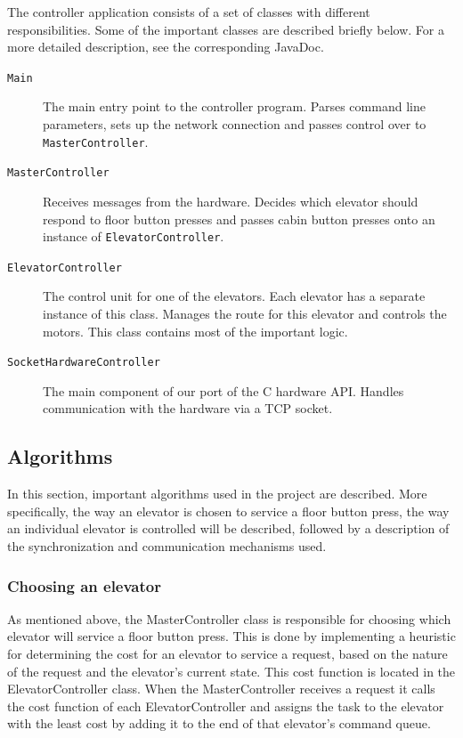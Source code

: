 \documentclass[a4paper]{article}
\begin{document}
The controller application consists of a set of classes with different
responsibilities. Some of the important classes are described briefly below. For
a more detailed description, see the corresponding JavaDoc.

\begin{description}

\item[\texttt{Main}] The main entry point to the controller program. Parses
    command line parameters, sets up the network connection and passes control
    over to \texttt{MasterController}.

\item[\texttt{MasterController}] Receives messages from the hardware. Decides
    which elevator should respond to floor button presses and passes cabin
    button presses onto an instance of \texttt{ElevatorController}.

\item[\texttt{ElevatorController}] The control unit for one of the elevators.
    Each elevator has a separate instance of this class. Manages the route for
    this elevator and controls the motors. This class contains most of the
    important logic.

\item[\texttt{SocketHardwareController}] The main component of our port of the C
    hardware API. Handles communication with the hardware via a TCP socket.

\end{description}

\subsection{Algorithms}
In this section, important algorithms used in the project are described. More specifically, the way an elevator is chosen to service a floor button press, the way an individual elevator is controlled will be described, followed by a description of the synchronization and communication mechanisms used.

\subsubsection{Choosing an elevator}
As mentioned above, the MasterController class is responsible for choosing which elevator will service a floor button press. This is done by implementing a heuristic for determining the cost for an elevator to service a request, based on the nature of the request and the elevator's current state. This cost function is located in the ElevatorController class. When the MasterController receives a request it calls the cost function of each ElevatorController and assigns the task to the elevator with the least cost by adding it to the end of that elevator's command queue.
\end{document}
